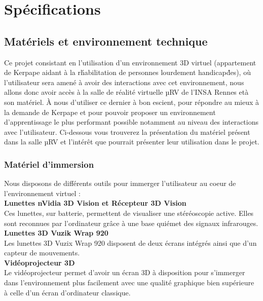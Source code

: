 \section{Spécifications}
\subsection{Mat\'eriels et environnement technique}

Ce projet consistant en l'utilisation d'un environnement 3D virtuel (appartement de Kerpape aidant \`a la r\'habilitation de personnes lourdement handicap\'des), o\`u l'utilisateur sera amen\'e \`a avoir des interactions avec cet environnement, nous allons donc avoir acc\`es \`a la salle de r\'ealit\'e virtuelle µRV de l'INSA Rennes et\`a son mat\'eriel. \`A nous d'utiliser ce dernier \`a bon escient, pour r\'epondre au mieux \`a la demande de Kerpape et pour pouvoir proposer un environnement d'apprentissage le plus performant possible notamment au niveau des interactions avec l'utilisateur. 
Ci-dessous vous trouverez la pr\'esentation du mat\'eriel pr\'esent dans la salle µRV et l'int\'er\^et que pourrait pr\'esenter leur utilisation dans le projet.

\subsubsection{Mat\'eriel d'immersion}
Nous disposons de diff\'erents outils pour immerger l'utilisateur au coeur de l'environnement virtuel : 
\\

\textbf{Lunettes nVidia 3D Vision et R\'ecepteur 3D Vision}
\\

Ces lunettes, sur batterie, permettent de visualiser une st\'er\'eoscopie active. Elles sont reconnues par l'ordinateur gr\^ace \`a une base qui\'emet des signaux infrarouges.
\\

\textbf{Lunettes 3D Vuzik Wrap 920}
\\

Les lunettes 3D Vuzix Wrap 920 disposent de deux \'ecrans int\'egr\'es ainsi que d'un capteur de mouvements.
\\

\textbf{Vid\'eoprojecteur 3D}
\\

Le vid\'eoprojecteur permet d'avoir un \'ecran 3D \`a disposition pour s'immerger dans l'environnement plus facilement avec une qualit\'e graphique bien sup\'erieure \`a celle d'un \'ecran d'ordinateur classique.
\\


